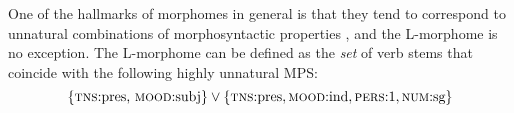 % 
%
One of the hallmarks of morphomes in general is that they tend to
correspond to unnatural combinations of morphosyntactic 
properties \citep{aronoff:md:2016}, and the L-morphome is no exception. 
The L-morphome can be defined as the \emph{set} of verb 
stems that coincide with the following highly unnatural \ac{MPS}:
\begin{equation}
\{ \text{\textsc{tns}:pres, \textsc{mood}:subj}\} \vee \{\text{\textsc{tns}:pres},\text{\textsc{mood}:ind},\text{\textsc{pers}:1},\text{\textsc{num}:sg}\}
\end{equation}



